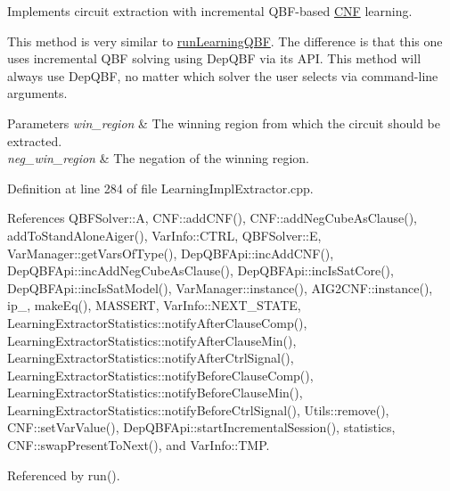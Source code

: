 Implements circuit extraction with incremental Q\-B\-F-\/based \hyperlink{classCNF}{C\-N\-F} learning. 

This method is very similar to \hyperlink{classLearningImplExtractor_a009b5382cc9a65cd7c7dfbbc73815bac}{run\-Learning\-Q\-B\-F}. The difference is that this one uses incremental Q\-B\-F solving using Dep\-Q\-B\-F via its A\-P\-I. This method will always use Dep\-Q\-B\-F, no matter which solver the user selects via command-\/line arguments.


\begin{DoxyParams}{Parameters}
{\em win\-\_\-region} & The winning region from which the circuit should be extracted. \\
\hline
{\em neg\-\_\-win\-\_\-region} & The negation of the winning region. \\
\hline
\end{DoxyParams}


Definition at line 284 of file Learning\-Impl\-Extractor.\-cpp.



References Q\-B\-F\-Solver\-::\-A, C\-N\-F\-::add\-C\-N\-F(), C\-N\-F\-::add\-Neg\-Cube\-As\-Clause(), add\-To\-Stand\-Alone\-Aiger(), Var\-Info\-::\-C\-T\-R\-L, Q\-B\-F\-Solver\-::\-E, Var\-Manager\-::get\-Vars\-Of\-Type(), Dep\-Q\-B\-F\-Api\-::inc\-Add\-C\-N\-F(), Dep\-Q\-B\-F\-Api\-::inc\-Add\-Neg\-Cube\-As\-Clause(), Dep\-Q\-B\-F\-Api\-::inc\-Is\-Sat\-Core(), Dep\-Q\-B\-F\-Api\-::inc\-Is\-Sat\-Model(), Var\-Manager\-::instance(), A\-I\-G2\-C\-N\-F\-::instance(), ip\-\_\-, make\-Eq(), M\-A\-S\-S\-E\-R\-T, Var\-Info\-::\-N\-E\-X\-T\-\_\-\-S\-T\-A\-T\-E, Learning\-Extractor\-Statistics\-::notify\-After\-Clause\-Comp(), Learning\-Extractor\-Statistics\-::notify\-After\-Clause\-Min(), Learning\-Extractor\-Statistics\-::notify\-After\-Ctrl\-Signal(), Learning\-Extractor\-Statistics\-::notify\-Before\-Clause\-Comp(), Learning\-Extractor\-Statistics\-::notify\-Before\-Clause\-Min(), Learning\-Extractor\-Statistics\-::notify\-Before\-Ctrl\-Signal(), Utils\-::remove(), C\-N\-F\-::set\-Var\-Value(), Dep\-Q\-B\-F\-Api\-::start\-Incremental\-Session(), statistics, C\-N\-F\-::swap\-Present\-To\-Next(), and Var\-Info\-::\-T\-M\-P.



Referenced by run().



